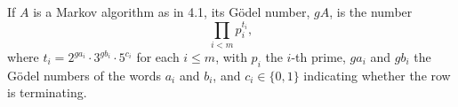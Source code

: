 If $A$ is a Markov algorithm as in 4.1, its Gödel number, $gA$, is the number
$$\prod_{i < m} p_i^{t_i},$$
where $t_i = 2^{g a_i} \cdot 3^{g b_i} \cdot 5^{c_i}$ for each $i \leq m$, with $p_i$ the $i$-th prime, $g a_i$ and $g b_i$ the Gödel numbers of the words $a_i$ and $b_i$, and $c_i \in \{0, 1\}$ indicating whether the row is terminating.
